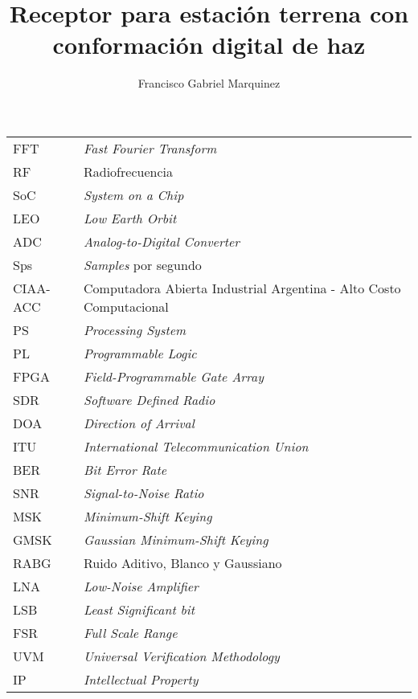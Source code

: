 \documentclass[screen, pagebackref,oneside]{ibtesis}
\title{Receptor para estación terrena con conformación digital de haz}
\author{Francisco Gabriel Marquinez}
\begin{document}
\begin{preliminary}


    \begin{abreviaturas}
        \begin{table}[H]
            \begin{tabular}{ll}
            FFT &   \textit{Fast Fourier Transform} \\
            RF  &   Radiofrecuencia                 \\
            SoC &   \textit{System on a Chip}       \\
            LEO &   \textit{Low Earth Orbit}        \\
            ADC &   \textit{Analog-to-Digital Converter} \\
            Sps &   \textit{Samples} por segundo   \\
            CIAA-ACC & Computadora Abierta Industrial Argentina - Alto Costo
            Computacional  \\
            PS  &   \textit{Processing System}  \\
            PL  &   \textit{Programmable Logic} \\
            FPGA &  \textit{Field-Programmable Gate Array} \\
            SDR &   \textit{Software Defined Radio} \\
            DOA &   \textit{Direction of Arrival}   \\
            ITU &   \textit{International Telecommunication Union} \\
            BER &   \textit{Bit Error Rate} \\
            SNR &   \textit{Signal-to-Noise Ratio}  \\
            MSK &   \textit{Minimum-Shift Keying}  \\
            GMSK &  \textit{Gaussian Minimum-Shift Keying} \\
            RABG &  Ruido Aditivo, Blanco y Gaussiano   \\
            LNA &   \textit{Low-Noise Amplifier}    \\
            LSB &   \textit{Least Significant bit}  \\
            FSR &   \textit{Full Scale Range}   \\
            UVM &   \textit{Universal Verification Methodology} \\
            IP &    \textit{Intellectual Property}  \\

\end{tabular}
\end{table}
\end{abreviaturas}
\end{preliminary}
\end{document}
